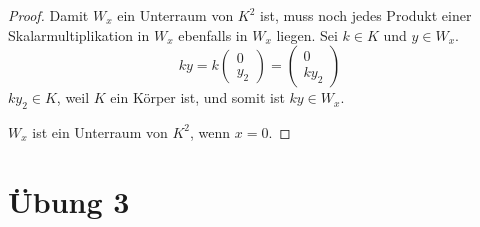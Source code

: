\documentclass[a4paper,10pt]{article}
\begin{document}
\begin{proof}
 Damit $W_x$ ein Unterraum von $K^2$ ist, muss noch jedes Produkt einer Skalarmultiplikation in $W_x$ ebenfalls in $W_x$ liegen.
 Sei $k \in K$ und $y \in W_x$.
 \begin{equation}
  ky = k\begin{pmatrix}0\\y_2\end{pmatrix} = \begin{pmatrix}0\\ky_2\end{pmatrix}
 \end{equation}
 $ky_2 \in K$, weil $K$ ein Körper ist, und somit ist $ky \in W_x$.
 
 $W_x$ ist ein Unterraum von $K^2$, wenn $x = 0$.
\end{proof}

\section*{Übung 3}
\end{document}
